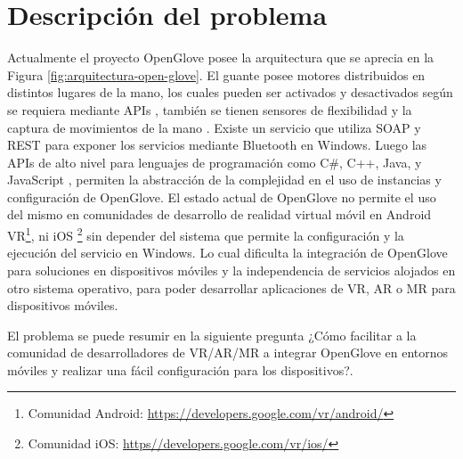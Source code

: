 \section{Descripción del problema}
\label{seccion:descripcion-problema}

  Actualmente el proyecto OpenGlove posee la  arquitectura que se aprecia en la Figura \ref{fig:arquitectura-open-glove}. El guante posee motores distribuidos en distintos lugares de la mano, los cuales pueden ser activados y desactivados según se requiera mediante APIs \citep{tesis-monsalve-rodrigo}, también se tienen sensores de flexibilidad y la captura de movimientos de la mano \citep{tesis-cerda-rodrigo} . Existe un servicio que utiliza SOAP y REST para exponer los servicios mediante Bluetooth en Windows. Luego las  APIs de alto nivel \citep{tesis-meneses-sebastian} para lenguajes de programación como C\#, C++, Java, y JavaScript , permiten la abstracción de  la complejidad en el uso de instancias y configuración de OpenGlove. El estado actual de OpenGlove no permite el uso del mismo en comunidades de desarrollo de realidad virtual móvil en Android VR\footnote{Comunidad Android: \url{https://developers.google.com/vr/android/}}, ni iOS \footnote{Comunidad iOS: \url{https//developers.google.com/vr/ios/}} sin depender del sistema que permite la configuración y la ejecución del servicio en Windows. Lo cual dificulta la integración de OpenGlove para soluciones en dispositivos móviles y la independencia de servicios alojados en otro sistema operativo,  para poder desarrollar aplicaciones de VR, AR o MR para dispositivos móviles.
  
El problema se puede resumir en la siguiente pregunta  ¿Cómo facilitar a la comunidad de desarrolladores de VR/AR/MR a integrar OpenGlove en entornos móviles y realizar una fácil configuración para los dispositivos?.
  
